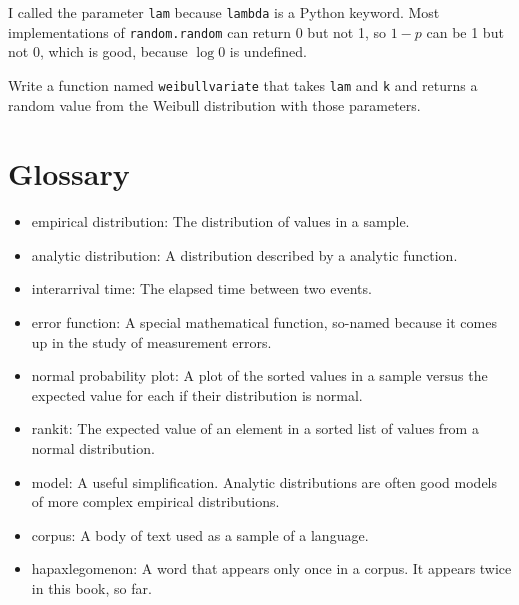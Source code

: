 \documentclass[12pt]{book}
\begin{document}
I called the parameter \verb"lam" because \verb"lambda" is a Python
keyword.  Most implementations of {\tt random.random} can return 0 but
not 1, so $1 - p$ can be 1 but not 0, which is good, because $\log 0$ is
undefined.

\begin{exercise}
Write a function named \verb"weibullvariate" that takes
\verb"lam" and \verb"k" and returns a random value from the Weibull
distribution with those parameters.

\end{exercise}


\section{Glossary}

\begin{itemize}

\item empirical distribution: The distribution of values in a sample.

\item analytic distribution: A distribution described by a analytic
function.

\item interarrival time: The elapsed time between two events.

\item error function: A special mathematical function, so-named
  because it comes up in the study of measurement errors.

\item normal probability plot: A plot of the sorted values in a sample
versus the expected value for each if their distribution is normal.

\item rankit: The expected value of an element in a sorted list of
values from a normal distribution.

\item model: A useful simplification.  Analytic distributions are
often good models of more complex empirical distributions.

\item corpus: A body of text used as a sample of a language.

\item hapaxlegomenon: A word that appears only once in a corpus.
It appears twice in this book, so far.

\end{itemize}
\end{document}
